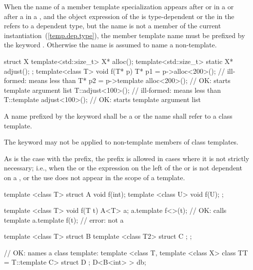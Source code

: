 \pnum
When the name of a member template specialization appears after
or
\tcode{->}
in a
or after a
in a
,
and the
object expression of the
is type-dependent
or
the  in the
refers to a dependent type, but the name is not
a member of the current instantiation~(\ref{temp.dep.type}),
the member template name must be prefixed by the keyword
.
Otherwise the name is assumed to name a non-template.
\begin{example}

\begin{codeblock}
struct X {
  template<std::size_t> X* alloc();
  template<std::size_t> static X* adjust();
};
template<class T> void f(T* p) {
  T* p1 = p->alloc<200>();          // ill-formed: \tcode{<} means less than
  T* p2 = p->template alloc<200>(); // OK: \tcode{<} starts template argument list
  T::adjust<100>();                 // ill-formed: \tcode{<} means less than
  T::template adjust<100>();        // OK: \tcode{<} starts template argument list
}
\end{codeblock}
\end{example}

\pnum
A name prefixed by the keyword
shall be a  or the name shall refer to a class template.
\begin{note}
The keyword
may not be applied to non-template members of class templates.
\end{note}
\begin{note}
As is the case with the
prefix, the
prefix is allowed in cases where it is not strictly
necessary; i.e., when the  or
the expression on the left of
the
\tcode{->}
or
is not dependent on a
, or the use does not appear in the
scope of a template.
\end{note}
\begin{example}
\begin{codeblock}
template <class T> struct A {
  void f(int);
  template <class U> void f(U);
};

template <class T> void f(T t) {
  A<T> a;
  a.template f<>(t);                // OK: calls template
  a.template f(t);                  // error: not a 
}

template <class T> struct B {
  template <class T2> struct C { };
};

// OK:  names a class template:
template <class T, template <class X> class TT = T::template C> struct D { };
D<B<int> > db;
\end{codeblock}
\end{example}

